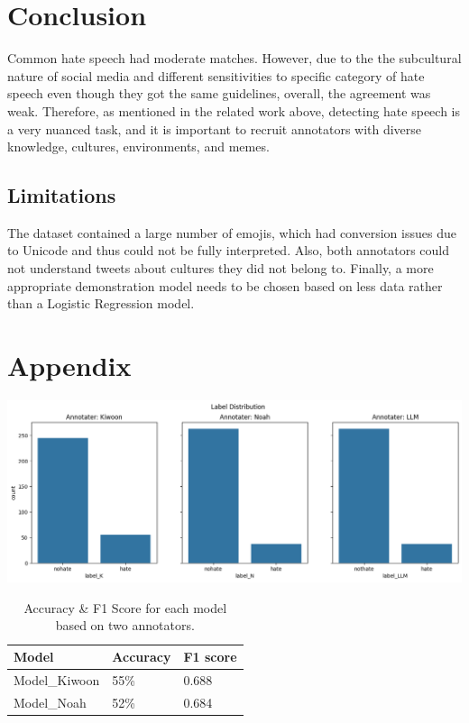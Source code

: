 \documentclass[11pt]{article}
\begin{document}
\section{Conclusion}
Common hate speech had moderate matches. However, due to the the subcultural nature of social media and different sensitivities to specific category of hate speech even though they got the same guidelines, overall, the agreement was weak. Therefore, as mentioned in the related work above, detecting hate speech is a very nuanced task, and it is important to recruit annotators with diverse knowledge, cultures, environments, and memes.
\subsection{Limitations}
The dataset contained a large number of emojis, which had conversion issues due to Unicode and thus could not be fully interpreted. Also, both annotators could not understand tweets about cultures they did not belong to. Finally, a more appropriate demonstration model needs to be chosen based on less data rather than a Logistic Regression model.


\appendix

\section{Appendix}
\label{sec:appendix}


\includegraphics[width=16cm]{figure/figure1.png}
\\

\begin{table}[ht]
\centering
\begin{tabular}{lll}
\hline
\textbf{Model} & \textbf{Accuracy} & \textbf{F1 score} \\ 
\hline
Model\_Kiwoon& 55\% & 0.688 \\ 
Model\_Noah& 52\% & 0.684 \\ 
\end{tabular}
\caption{\label{citation-guide}
Accuracy \& F1 Score for each model based on two annotators.
}
\end{table}
\end{document}
